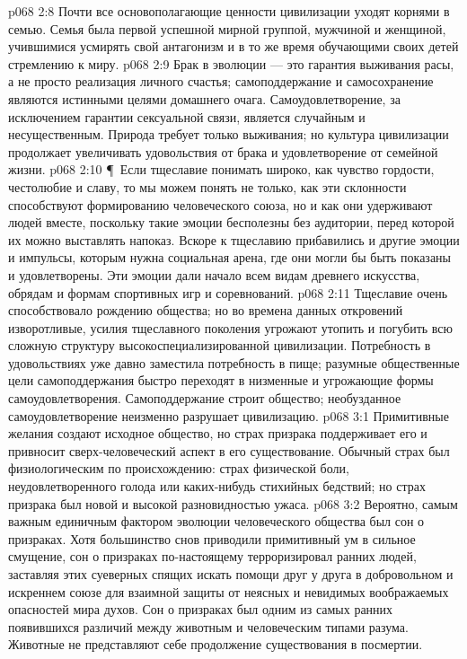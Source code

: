 \vs p068 2:8 Почти все основополагающие ценности цивилизации уходят корнями в семью. Семья была первой успешной мирной группой, мужчиной и женщиной, учившимися усмирять свой антагонизм и в то же время обучающими своих детей стремлению к миру.
\vs p068 2:9 Брак в эволюции --- это гарантия выживания расы, а не просто реализация личного счастья; самоподдержание и самосохранение являются истинными целями домашнего очага. Самоудовлетворение, за исключением гарантии сексуальной связи, является случайным и несущественным. Природа требует только выживания; но культура цивилизации продолжает увеличивать удовольствия от брака и удовлетворение от семейной жизни.
\vs p068 2:10 \P\ Если тщеславие понимать широко, как чувство гордости, честолюбие и славу, то мы можем понять не только, как эти склонности способствуют формированию человеческого союза, но и как они удерживают людей вместе, поскольку такие эмоции бесполезны без аудитории, перед которой их можно выставлять напоказ. Вскоре к тщеславию прибавились и другие эмоции и импульсы, которым нужна социальная арена, где они могли бы быть показаны и удовлетворены. Эти эмоции дали начало всем видам древнего искусства, обрядам и формам спортивных игр и соревнований.
\vs p068 2:11 Тщеславие очень способствовало рождению общества; но во времена данных откровений изворотливые, усилия тщеславного поколения угрожают утопить и погубить всю сложную структуру высокоспециализированной цивилизации. Потребность в удовольствиях уже давно заместила потребность в пище; разумные общественные цели самоподдержания быстро переходят в низменные и угрожающие формы самоудовлетворения. Самоподдержание строит общество; необузданное самоудовлетворение неизменно разрушает цивилизацию.
\vs p068 3:1 Примитивные желания создают исходное общество, но страх призрака поддерживает его и привносит сверх\hyp{}человеческий аспект в его существование. Обычный страх был физиологическим по происхождению: страх физической боли, неудовлетворенного голода или каких\hyp{}нибудь стихийных бедствий; но страх призрака был новой и высокой разновидностью ужаса.
\vs p068 3:2 Вероятно, самым важным единичным фактором эволюции человеческого общества был сон о призраках. Хотя большинство снов приводили примитивный ум в сильное смущение, сон о призраках по\hyp{}настоящему терроризировал ранних людей, заставляя этих суеверных спящих искать помощи друг у друга в добровольном и искреннем союзе для взаимной защиты от неясных и невидимых воображаемых опасностей мира духов. Сон о призраках был одним из самых ранних появившихся различий между животным и человеческим типами разума. Животные не представляют себе продолжение существования в посмертии.
